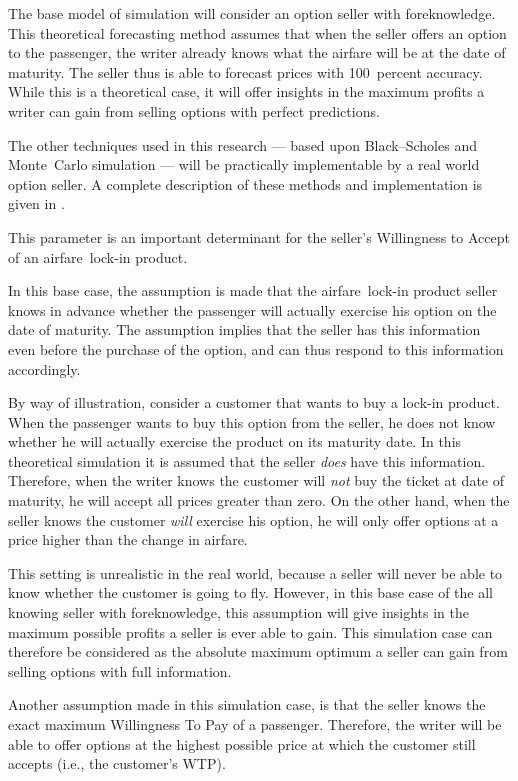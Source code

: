 The base model of simulation will consider an option seller with foreknowledge. This theoretical forecasting method assumes that when the seller offers an option to the passenger, the writer already knows what the airfare will be at the date of maturity. The seller thus is able to forecast prices with 100~percent accuracy. While this is a theoretical case, it will offer insights in the maximum profits a writer can gain from selling options with perfect predictions.

The other techniques used in this research --- based upon Black--Scholes and Monte~Carlo simulation --- will be practically implementable by a real world option seller. A complete description of these methods and implementation is given in .

This parameter is an important determinant for the seller's Willingness to Accept of an airfare~lock-in product.

In this base case, the assumption is made that the airfare~lock-in product seller knows in advance whether the passenger will actually exercise his option on the date of maturity. The assumption implies that the seller has this information even before the purchase of the option, and can thus respond to this information accordingly.

By way of illustration, consider a customer that wants to buy a lock-in product. When the passenger wants to buy this option from the seller, he does not know whether he will actually exercise the product on its maturity date. In this theoretical simulation it is assumed that the seller \emph{does} have this information. Therefore, when the writer knows the customer will \emph{not} buy the ticket at date of maturity, he will accept all prices greater than zero. On the other hand, when the seller knows the customer \emph{will} exercise his option, he will only offer options at a price higher than the change in airfare.

This setting is unrealistic in the real world, because a seller will never be able to know whether the customer is going to fly. However, in this base case of the all knowing seller with foreknowledge, this assumption will give insights in the maximum possible profits a seller is ever able to gain. This simulation case can therefore be considered as the absolute maximum optimum a seller can gain from selling options with full information.

Another assumption made in this simulation case, is that the seller knows the exact maximum Willingness To Pay of a passenger. Therefore, the writer will be able to offer options at the highest possible price at which the customer still accepts (i.e., the customer's WTP).


